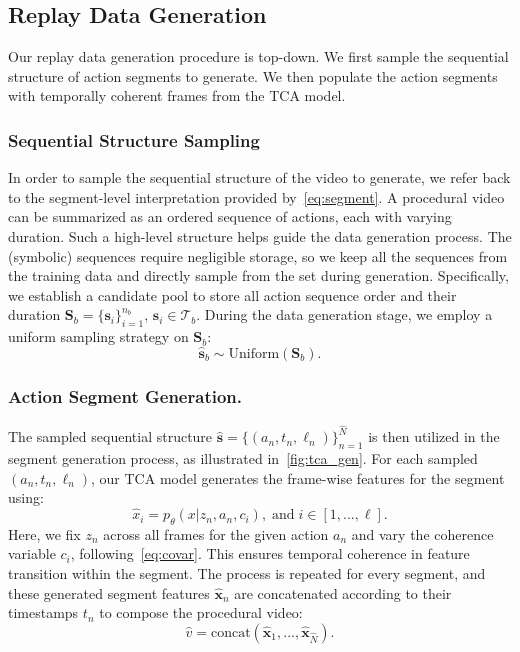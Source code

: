 \subsection{Replay Data Generation}
 
Our replay data generation procedure is top-down. We first sample the sequential structure of action segments to generate. We then populate the action segments with temporally coherent frames from the TCA model.

\subsubsection{Sequential Structure Sampling}

In order to sample the sequential structure of the video to generate, we refer back to the segment-level interpretation provided by~\cref{eq:segment}. A procedural video can be summarized as an ordered sequence of actions, each with varying duration. Such a high-level structure helps guide the data generation process. The (symbolic) sequences require negligible storage, so we keep all the sequences from the training data and directly sample from the set during generation. Specifically, we establish a candidate pool to store all action sequence order and their duration $\mathbf{S}_b=\{\mathbf{s}_i\}_{i=1}^{n_{b}},\,\mathbf{s}_i \in \mathcal{T}_{b}$. During the data generation stage, we employ a uniform sampling strategy on $\mathbf{S}_b$:
\begin{equation}\label{eq:sample}
    \hat{\mathbf{s}}_b \sim \text{Uniform}(\mathbf{S}_{b}).
\end{equation}

\subsubsection{Action Segment Generation.} 



The sampled sequential structure $\hat{\mathbf{s}} = \{(a_n, t_n, \ell_n)\}_{n=1}^{\hat{N}}$ is then utilized in the segment generation process, as illustrated in~\cref{fig:tca_gen}.  
For each sampled $(a_n, t_n, \ell_n)$, our TCA model generates the frame-wise features for the segment using:
\begin{equation}\label{eq:segfeat}
   \hat{x}_i = p_{\theta}(x|z_n, a_n, c_i),\; \text{and}\; {i \in [1,...,\ell]}.
\end{equation}
Here, we fix $z_n$ across all frames for the given action $a_n$ and vary the coherence variable $c_i$, following~\cref{eq:covar}. This ensures temporal coherence in feature transition within the segment. The process is repeated for every segment, and these generated segment features $\hat{\mathbf{x}}_n$ are concatenated according to their timestamps $t_n$ to compose the procedural video:
\begin{equation}\label{eq:gen}
    \hat{v} = \text{concat}(\hat{\mathbf{x}}_1, ..., \hat{\mathbf{x}}_{\hat{N}}).
\end{equation}

